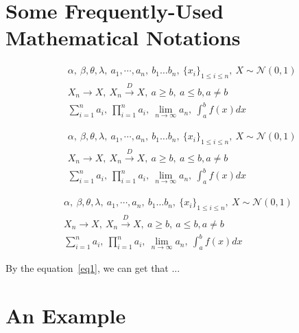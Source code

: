 \documentclass[11pt]{article}
\theoremstyle{mytheoremstyle}
\begin{document}
\newpage

\section{Some Frequently-Used Mathematical Notations}

\begin{align*}
&\alpha,\ \beta,\theta, \lambda,\  a_1,\cdots,a_n,\ b_1\ldots b_n,\ \{x_i\}_{1\le i\le n},\  X\sim \mathcal{N}(0,1)\\
&X_n\rightarrow X,\ X_n\overset{D}\longrightarrow X,\ a\geq b,\ a\leq b, a\neq b\\
&\sum_{i=1}^n a_i,\ \prod_{i=1}^n a_i,\ \lim_{n\rightarrow \infty}a_n,\ \int_a^b f(x)dx 
\end{align*}


\begin{align}
&\alpha,\ \beta,\theta, \lambda,\ a_1,\cdots,a_n,\ b_1\ldots b_n,\ \{x_i\}_{1\le i\le n},\  X\sim \mathcal{N}(0,1)\label{eq1}\\
&X_n\rightarrow X,\ X_n\overset{D}\longrightarrow X,\ a\geq b,\ a\leq b, a\neq b\\
&\sum_{i=1}^n a_i,\ \prod_{i=1}^n a_i,\ \lim_{n\rightarrow \infty}a_n,\ \int_a^b f(x)dx 
\end{align}


\begin{gather}
\alpha,\ \beta,\theta, \lambda,\ a_1,\cdots,a_n,\ b_1\ldots b_n,\ \{x_i\}_{1\le i\le n},\  X\sim \mathcal{N}(0,1)\\
X_n\rightarrow X,\ X_n\overset{D}\longrightarrow X,\ a\geq b,\ a\leq b, a\neq b\\
\sum_{i=1}^n a_i,\ \prod_{i=1}^n a_i,\ \lim_{n\rightarrow \infty}a_n,\ \int_a^b f(x)dx 
\end{gather}

By the equation~\eqref{eq1}, we can get that ... 



\section{An Example}
\end{document}
